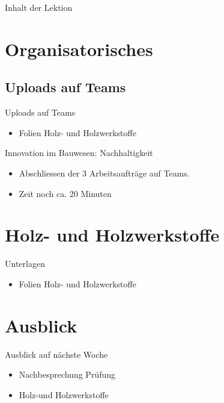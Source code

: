 \begin{frame}{Inhalt der Lektion}
	\tableofcontents
\end{frame}

\folieFragen

\section{Organisatorisches}
\BlueSectionSlide

\subsection{Uploads auf Teams}
\begin{frame}{Uploads auf Teams}
	\begin{itemize}
		\item[\textbullet] Folien Holz- und Holzwerkstoffe
	\end{itemize}

\end{frame}






\begin{frame}{Innovation im Bauwesen: Nachhaltigkeit}
	\begin{itemize}
		\item Abschliessen der 3 Arbeitsaufträge auf Teams.
		\item Zeit noch ca. 20 Minuten
	\end{itemize}

\end{frame}

\section{Holz- und Holzwerkstoffe}
\BlueSectionSlide
\begin{frame}{Unterlagen}
	\begin{itemize}
		\item[\textbullet] Folien Holz- und Holzwerkstoffe
	\end{itemize}

\end{frame}

\folieFragen



\section{Ausblick}
\BlueSectionSlide
{}

\begin{frame}{Ausblick auf nächste Woche}
	\begin{itemize}
		\item[\textbullet] Nachbesprechung Prüfung
		\item[\textbullet] Holz-und Holzwerkstoffe
	\end{itemize}
\end{frame}





